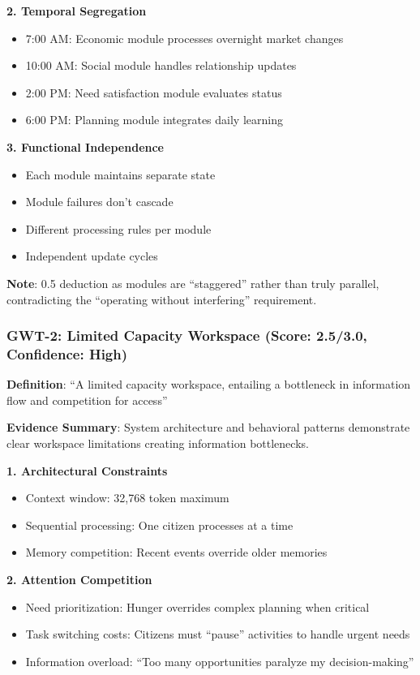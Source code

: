 \documentclass[12pt,a4paper]{article}
\begin{document}
\textbf{2. Temporal Segregation}
\begin{itemize}
    \item 7:00 AM: Economic module processes overnight market changes
    \item 10:00 AM: Social module handles relationship updates
    \item 2:00 PM: Need satisfaction module evaluates status
    \item 6:00 PM: Planning module integrates daily learning
\end{itemize}

\textbf{3. Functional Independence}
\begin{itemize}
    \item Each module maintains separate state
    \item Module failures don't cascade
    \item Different processing rules per module
    \item Independent update cycles
\end{itemize}

\textbf{Note}: 0.5 deduction as modules are ``staggered'' rather than truly parallel, contradicting the ``operating without interfering'' requirement.

\subsubsection{GWT-2: Limited Capacity Workspace (Score: 2.5/3.0, Confidence: High)}

\textbf{Definition}: ``A limited capacity workspace, entailing a bottleneck in information flow and competition for access''

\textbf{Evidence Summary}: System architecture and behavioral patterns demonstrate clear workspace limitations creating information bottlenecks.

\textbf{1. Architectural Constraints}
\begin{itemize}
    \item Context window: 32,768 token maximum
    \item Sequential processing: One citizen processes at a time
    \item Memory competition: Recent events override older memories
\end{itemize}

\textbf{2. Attention Competition}
\begin{itemize}
    \item Need prioritization: Hunger overrides complex planning when critical
    \item Task switching costs: Citizens must ``pause'' activities to handle urgent needs
    \item Information overload: ``Too many opportunities paralyze my decision-making''
\end{itemize}
\end{document}
